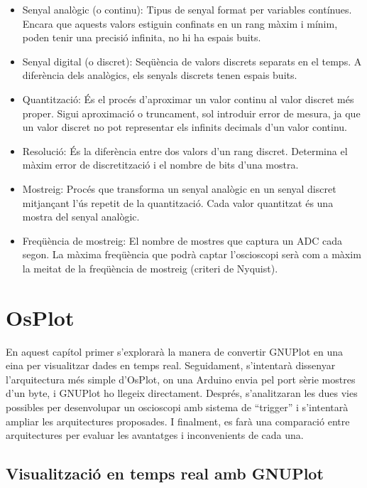 \documentclass{tfgitic}[2023/06/30]
\begin{document}
\begin{itemize}
	\item Senyal analògic (o continu): Tipus de senyal format per
          variables contínues. Encara que aquests valors estiguin
          confinats en un rang màxim i mínim, poden tenir una precisió
          infinita, no hi ha espais buits.
	\item Senyal digital (o discret): Seqüència de valors discrets
          separats en el temps. A diferència dels analògics, els
          senyals discrets tenen espais buits.
	\item Quantització: És el procés d'aproximar un valor continu
          al valor discret més proper. Sigui aproximació o truncament,
          sol introduir error de mesura, ja que un valor discret no
          pot representar els infinits decimals d'un valor continu.
	\item Resolució: És la diferència entre dos valors d'un rang
          discret. Determina el màxim error de discretització i el
          nombre de bits d'una mostra.
	\item Mostreig: Procés que transforma un senyal analògic en un
          senyal discret mitjançant l'ús repetit de la quantització.
          Cada valor quantitzat és una mostra del senyal analògic.
	\item Freqüència de mostreig: El nombre de mostres que captura
          un ADC cada segon. La màxima freqüència que podrà captar
          l'osci\lgem oscopi serà com a màxim la meitat de la
          freqüència de mostreig (criteri de Nyquist).
\end{itemize}

\chapter{OsPlot}

En aquest capítol primer s'explorarà la manera de convertir GNUPlot en
una eina per visualitzar dades en temps real. Seguidament, s'intentarà
dissenyar l'arquitectura més simple d'OsPlot, on una Arduino envia pel
port sèrie mostres d'un byte, i GNUPlot ho llegeix directament.
Després, s'analitzaran les dues vies possibles per desenvolupar un
osci\lgem oscopi amb sistema de ``trigger'' i s'intentarà ampliar les
arquitectures proposades. I finalment, es farà una comparació entre
arquitectures per evaluar les avantatges i inconvenients de cada una.

\section{Visualització en temps real amb GNUPlot}
\end{document}

